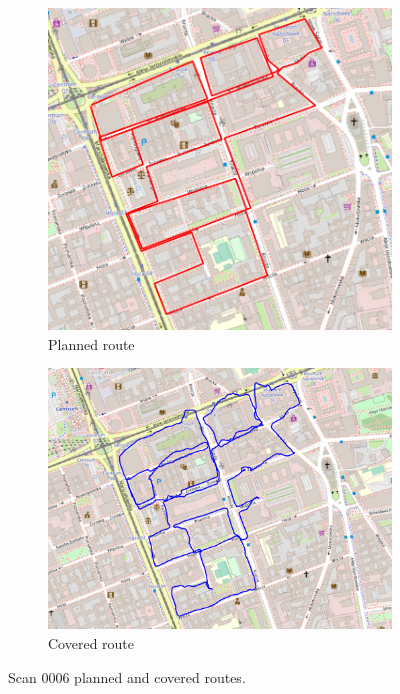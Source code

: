\documentclass[a4paper,12pt]{book}
\begin{document}
\begin{enumerate}
\begin{figure}[H]
\begin{subfigure}{.80\textwidth}
		\includegraphics[width=1\linewidth]{route_p6}
		\caption{Planned route}
		\label{fig:a6}
	\end{subfigure}%
	\linebreak
	\begin{subfigure}{.80\textwidth}
		\centering
		\includegraphics[width=1\linewidth]{route_c6}
		\caption{Covered route}
		\label{fig:b6}
	\end{subfigure}
	\caption{Scan 0006 planned and covered routes.}
	\label{fig:fig6}
\end{figure} 
\end{enumerate}
\end{document}
